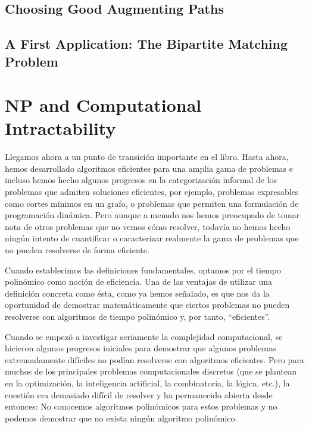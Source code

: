 \documentclass[a4paper, 12pt]{book}
\theoremstyle{dotless}
\begin{document}
\section{Choosing Good Augmenting Paths}

\section{A First Application: The Bipartite Matching Problem}


\chapter{NP and Computational Intractability}

\graphicspath{ {./Imagenes-Seccion8/} }

Llegamos ahora a un punto de transición importante en el libro. Hasta ahora, hemos desarrollado algoritmos eficientes para una amplia gama de problemas e incluso hemos hecho algunos progresos en la categorización informal de los problemas que admiten soluciones eficientes, por ejemplo, problemas expresables como cortes mínimos en un grafo, o problemas que permiten una formulación de programación dinámica. Pero aunque a menudo nos hemos preocupado de tomar nota de otros problemas que no vemos cómo resolver, todavía no hemos hecho ningún intento de cuantificar o caracterizar realmente la gama de problemas que no pueden resolverse de forma eficiente.

Cuando establecimos las definiciones fundamentales, optamos por el tiempo polinómico como noción de eficiencia. Una de las ventajas de utilizar una definición concreta como ésta, como ya hemos señalado, es que nos da la oportunidad de demostrar matemáticamente que ciertos problemas no pueden resolverse con algoritmos de tiempo polinómico y, por tanto, ``eficientes''.

Cuando se empezó a investigar seriamente la complejidad computacional, se hicieron algunos progresos iniciales para demostrar que algunos problemas extremadamente difíciles no podían resolverse con algoritmos eficientes. Pero para muchos de los principales problemas computacionales discretos (que se plantean en la optimización, la inteligencia artificial, la combinatoria, la lógica, etc.), la cuestión era demasiado difícil de resolver y ha permanecido abierta desde entonces: No conocemos algoritmos polinómicos para estos problemas y no podemos demostrar que no exista ningún algoritmo polinómico.
\end{document}
